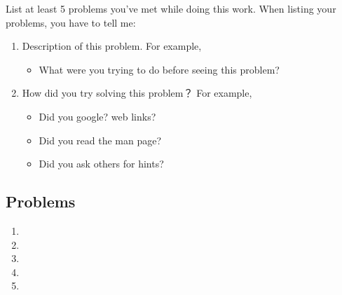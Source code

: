 \documentclass{swfulabreport}
\begin{document}
List at least 5 problems you've met while doing this work. When
listing your problems, you have to tell me:
\begin{enumerate}
\item Description of this problem. For example,
  \begin{itemize}
  \item What were you trying to do before seeing this problem?
  \end{itemize}
\item How did you try solving this problem？ For example,
  \begin{itemize}
  \item Did you google? web links?
  \item Did you read the man page?
  \item Did you ask others for hints?
  \end{itemize}
\end{enumerate}

\subsection{Problems}

\begin{enumerate}
\item

\item

\item

\item

\item
\end{enumerate}
\end{document}
